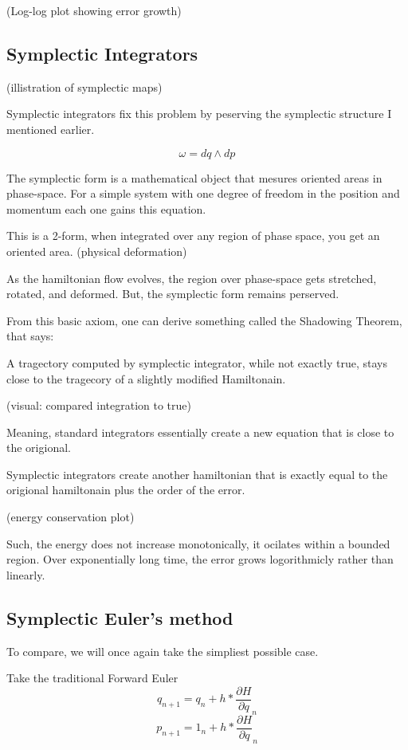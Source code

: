 (Log-log plot showing error growth)

\subsection{Symplectic Integrators}
(illistration of symplectic maps)

Symplectic integrators fix this problem by peserving the symplectic structure I mentioned earlier.

\[
	\omega = dq \wedge dp
\]

The symplectic form is a mathematical object that mesures oriented areas in phase-space. For a simple system with one degree of freedom in the position and momentum each one gains this equation.

This is a 2-form, when integrated over any region of phase space, you get an oriented area.
(physical deformation)

As the hamiltonian flow evolves, the region over phase-space gets stretched, rotated, and deformed. But, the symplectic form remains perserved.

From this basic axiom, one can derive something called the Shadowing Theorem, that says:

A tragectory computed by symplectic integrator, while not exactly true, stays close to the tragecory of a slightly modified Hamiltonain.

(visual: compared integration to true)

Meaning, standard integrators essentially create a new equation that is close to the origional.

Symplectic integrators create another hamiltonian that is exactly equal to the origional hamiltonain plus the order of the error.

(energy conservation plot)

Such, the energy does not increase monotonically, it ocilates within a bounded region. Over exponentially long time, the error grows logorithmicly rather than linearly.

\subsection{Symplectic Euler's method}

To compare, we will once again take the simpliest possible case.

Take the traditional Forward Euler
\[
	q_{n+1} = q_n + h * \frac{\partial H}{\partial q}_n
\]
\[
	p_{n+1}=1_n +h * \frac{\partial H}{\partial q}_n
\]

